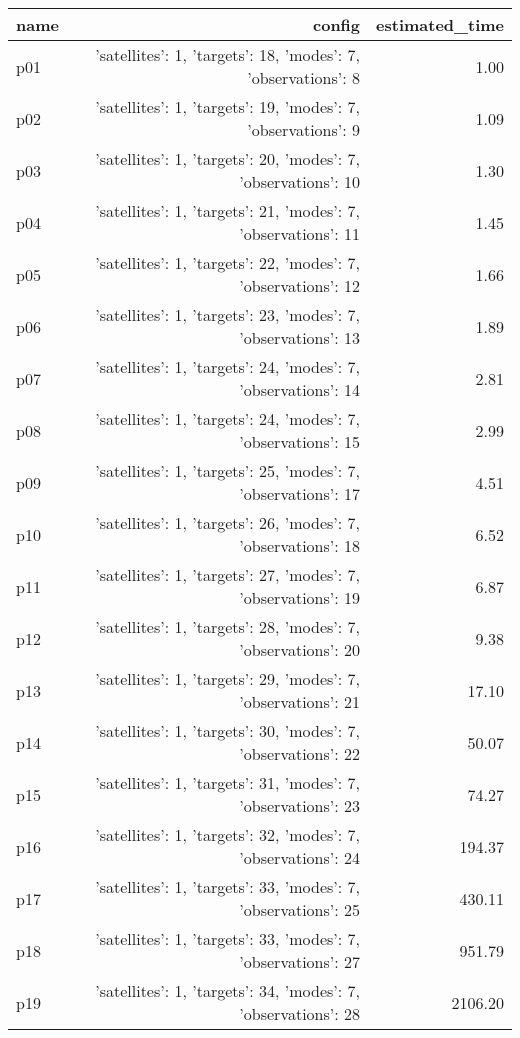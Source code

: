 \documentclass{article}
\begin{document}
                            \begin{center}
                            \scriptsize
                            \begin{tabular}{@{}l|r|r@{}}
                            name & config & estimated\_time\\\midrule
                              p01&{'satellites': 1, 'targets': 18, 'modes': 7, 'observations': 8}&1.00\\
  p02&{'satellites': 1, 'targets': 19, 'modes': 7, 'observations': 9}&1.09\\
  p03&{'satellites': 1, 'targets': 20, 'modes': 7, 'observations': 10}&1.30\\
  p04&{'satellites': 1, 'targets': 21, 'modes': 7, 'observations': 11}&1.45\\
  p05&{'satellites': 1, 'targets': 22, 'modes': 7, 'observations': 12}&1.66\\
  p06&{'satellites': 1, 'targets': 23, 'modes': 7, 'observations': 13}&1.89\\
  p07&{'satellites': 1, 'targets': 24, 'modes': 7, 'observations': 14}&2.81\\
  p08&{'satellites': 1, 'targets': 24, 'modes': 7, 'observations': 15}&2.99\\
  p09&{'satellites': 1, 'targets': 25, 'modes': 7, 'observations': 17}&4.51\\
  p10&{'satellites': 1, 'targets': 26, 'modes': 7, 'observations': 18}&6.52\\
  p11&{'satellites': 1, 'targets': 27, 'modes': 7, 'observations': 19}&6.87\\
  p12&{'satellites': 1, 'targets': 28, 'modes': 7, 'observations': 20}&9.38\\
  p13&{'satellites': 1, 'targets': 29, 'modes': 7, 'observations': 21}&17.10\\
  p14&{'satellites': 1, 'targets': 30, 'modes': 7, 'observations': 22}&50.07\\
  p15&{'satellites': 1, 'targets': 31, 'modes': 7, 'observations': 23}&74.27\\
  p16&{'satellites': 1, 'targets': 32, 'modes': 7, 'observations': 24}&194.37\\
  p17&{'satellites': 1, 'targets': 33, 'modes': 7, 'observations': 25}&430.11\\
  p18&{'satellites': 1, 'targets': 33, 'modes': 7, 'observations': 27}&951.79\\
  p19&{'satellites': 1, 'targets': 34, 'modes': 7, 'observations': 28}&2106.20\\

\end{tabular}
\end{center}
\end{document}
